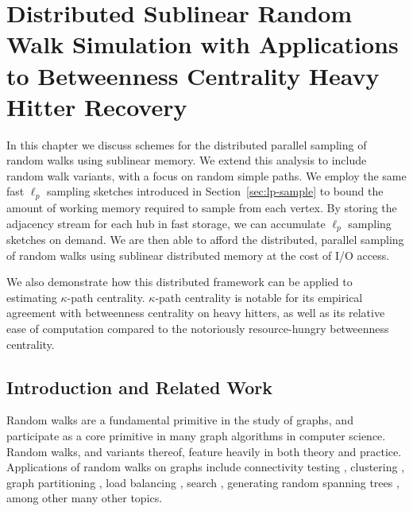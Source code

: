 \documentclass[10]{report}
\begin{document}
\chapter{Distributed Sublinear Random Walk Simulation with Applications to Betweenness Centrality Heavy Hitter Recovery}
 \label{chap:walks}

In this chapter we discuss schemes for the distributed parallel sampling of random walks using sublinear memory.
We extend this analysis to include random walk variants, with a focus on random simple paths.
We employ the same fast $\ell_p$ sampling sketches introduced in Section~\ref{sec:lp-sample} to bound the amount of working memory required to  sample from each vertex. 
By storing the adjacency stream for each hub in fast storage, we can accumulate $\ell_p$ sampling sketches on demand.
We are then able to afford the distributed, parallel sampling of random walks using sublinear distributed memory at the cost of I/O access. 

We also demonstrate how this distributed framework can be applied to estimating $\kappa$-path centrality.
$\kappa$-path centrality is notable for its empirical agreement with betweenness centrality on heavy hitters, as well as its relative ease of computation compared to the notoriously resource-hungry betweenness centrality. 



\section{Introduction and Related Work}
 \label{walks:sec:intro}

Random walks are a fundamental primitive in the study of graphs, and participate as a core primitive in many graph algorithms in computer science.
Random walks, and variants thereof, feature heavily in both theory and practice. 
Applications of random walks on graphs include connectivity testing \cite{reingold2008undirected}, clustering \cite{andersen2009finding}, graph partitioning \cite{charikar2003better, andersen2007using, spielman2013local}, load balancing \cite{karger2004simple}, search \cite{adamic2001search, lv2002search}, generating random spanning trees \cite{broder1989generating}, among other many other topics. 
\end{document}
